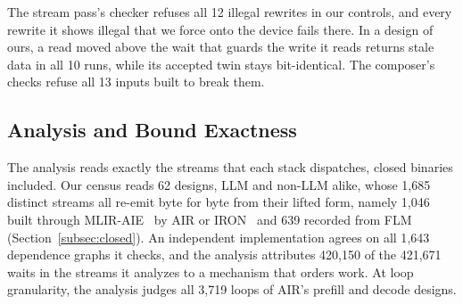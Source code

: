 The stream pass's checker refuses all 12 illegal rewrites in our controls, and every rewrite it shows illegal that we force onto the device fails there.
In a design of ours, a read moved above the wait that guards the write it reads returns stale data in all 10 runs, while its accepted twin stays bit-identical.
The composer's checks refuse all 13 inputs built to break them.

\subsection{Analysis and Bound Exactness}
\label{subsec:census}

The analysis reads exactly the streams that each stack dispatches, closed binaries included.
Our census reads 62 designs, LLM and non-LLM alike, whose 1{,}685 distinct streams all re-emit byte for byte from their lifted form, namely 1{,}046 built through MLIR-AIE~\citep{mlir-aie-repo} by AIR or IRON~\citep{hunhoff2025iron} and 639 recorded from FLM (Section~\ref{subsec:closed}).
An independent implementation agrees on all 1{,}643 dependence graphs it checks, and the analysis attributes 420{,}150 of the 421{,}671 waits in the streams it analyzes to a mechanism that orders work.
At loop granularity, the analysis judges all 3{,}719 loops of AIR's prefill and decode designs.

